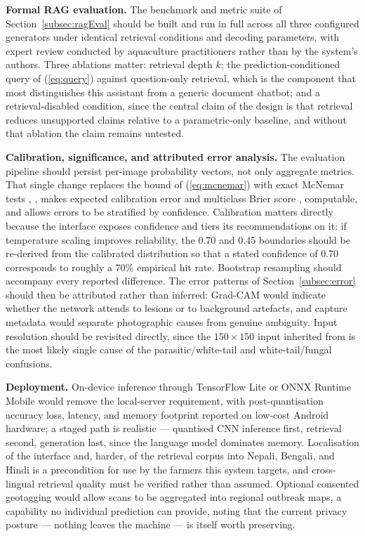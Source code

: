 \documentclass[conference]{IEEEtran}
\begin{document}
\textbf{Formal RAG evaluation.} The benchmark and metric suite of Section~\ref{subsec:ragEval} should be built and run in full across all three configured generators under identical retrieval conditions and decoding parameters, with expert review conducted by aquaculture practitioners rather than by the system's authors. Three ablations matter: retrieval depth $k$; the prediction-conditioned query of (\ref{eq:query}) against question-only retrieval, which is the component that most distinguishes this assistant from a generic document chatbot; and a retrieval-disabled condition, since the central claim of the design is that retrieval reduces unsupported claims relative to a parametric-only baseline, and without that ablation the claim remains untested.

\textbf{Calibration, significance, and attributed error analysis.} The evaluation pipeline should persist per-image probability vectors, not only aggregate metrics. That single change replaces the bound of (\ref{eq:mcnemar}) with exact McNemar tests \cite{b16}, \cite{b18}, makes expected calibration error and multiclass Brier score \cite{b22}, \cite{b23} computable, and allows errors to be stratified by confidence. Calibration matters directly because the interface exposes confidence and tiers its recommendations on it: if temperature scaling improves reliability, the 0.70 and 0.45 boundaries should be re-derived from the calibrated distribution so that a stated confidence of 0.70 corresponds to roughly a 70\% empirical hit rate. Bootstrap resampling \cite{b19} should accompany every reported difference. The error patterns of Section~\ref{subsec:error} should then be attributed rather than inferred: Grad-CAM \cite{b30} would indicate whether the network attends to lesions or to background artefacts, and capture metadata would separate photographic causes from genuine ambiguity. Input resolution should be revisited directly, since the $150\times150$ input inherited from \cite{b1} is the most likely single cause of the parasitic/white-tail and white-tail/fungal confusions.

\textbf{Deployment.} On-device inference through TensorFlow Lite \cite{b31} or ONNX Runtime Mobile would remove the local-server requirement, with post-quantisation accuracy loss, latency, and memory footprint reported on low-cost Android hardware; a staged path is realistic --- quantised CNN inference first, retrieval second, generation last, since the language model dominates memory. Localisation of the interface and, harder, of the retrieval corpus into Nepali, Bengali, and Hindi is a precondition for use by the farmers this system targets, and cross-lingual retrieval quality must be verified rather than assumed. Optional consented geotagging would allow scans to be aggregated into regional outbreak maps, a capability no individual prediction can provide, noting that the current privacy posture --- nothing leaves the machine --- is itself worth preserving.
\end{document}
